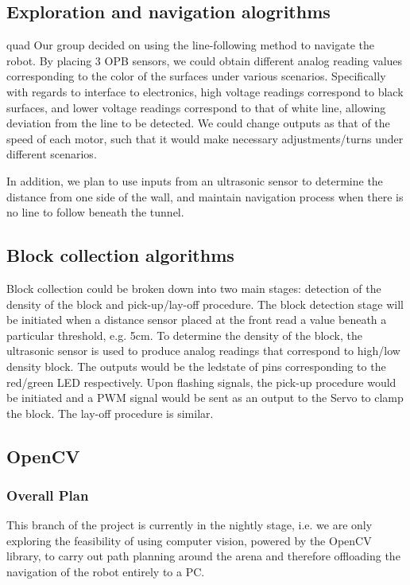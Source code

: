 \documentclass{article}
\begin{document}
\subsection{Exploration and navigation alogrithms}
\quad quad Our group decided on using the line-following method to navigate the robot. By placing 3 OPB sensors, we could obtain different analog reading values corresponding to the color of the surfaces under various scenarios. Specifically with regards to interface to electronics, high voltage readings correspond to black surfaces, and lower voltage readings correspond to that of white line, allowing deviation from the line to be detected. We could change outputs as that of the speed of each motor, such that it would make necessary adjustments/turns under different scenarios. 

\quad In addition, we plan to use inputs from an ultrasonic sensor to determine the distance from one side of the wall, and maintain navigation process when there is no line to follow beneath the tunnel. 

\subsection{Block collection algorithms}
\quad Block collection could be broken down into two main stages: detection of the density of the block and pick-up/lay-off procedure. The block detection stage will be initiated when a distance sensor placed at the front read a value beneath a particular threshold, e.g. 5cm. To determine the density of the block, the ultrasonic sensor is used to produce analog readings that correspond to high/low density block. The outputs would be the ledstate of pins corresponding to the red/green LED respectively. Upon flashing signals, the pick-up procedure would be initiated and a PWM signal would be sent as an output to the Servo to clamp the block. The lay-off procedure is similar. 

\subsection{OpenCV}
\subsubsection{Overall Plan}
This branch of the project is currently in the nightly stage, i.e. we are only exploring the feasibility of using computer vision, powered by the OpenCV library, to carry out path planning around the arena and therefore offloading the navigation of the robot entirely to a PC.
\end{document}
